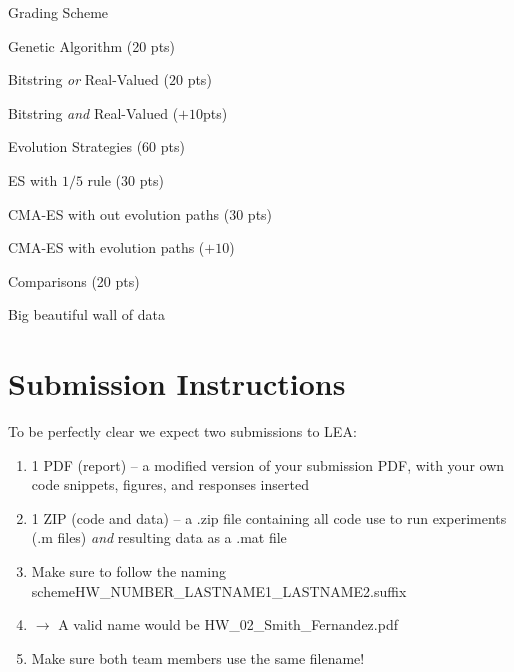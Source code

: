 \documentclass{article}
\begin{document}
	\begin{itemize}
 	\item Grading Scheme
 		\item Evolution Strategies (60 pts)
 		\item Comparisons (20 pts)
 		\end{todolist}
	\end{itemize}
\newpage


\section{Submission Instructions}
To be perfectly clear we expect two submissions to LEA:
\begin{enumerate}
	\item 1 PDF (report) -- a modified version of your submission PDF, with your own code snippets, figures, and responses inserted
	\item 1 ZIP (code and data)   -- a .zip file containing all code use to run experiments (.m files) \textit{and} resulting data as a .mat file
	\item Make sure to follow the naming scheme\newline HW\_NUMBER\_LASTNAME1\_LASTNAME2.suffix
	\item $\rightarrow$ A valid name would be HW\_02\_Smith\_Fernandez.pdf
	\item Make sure both team members use the same filename!
\end{enumerate}
\end{document}
